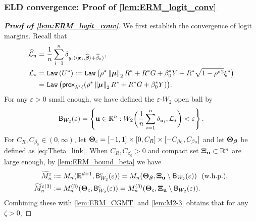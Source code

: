 \subsubsection{ELD convergence: Proof of \cref{lem:ERM_logit_conv}}
\label{append_subsubsec:ERM_logit}

\begin{proof}[\textbf{Proof of \cref{lem:ERM_logit_conv}}]
We first establish the convergence of logit margins. Recall that
\begin{align*}
    \widehat {\mathcal{L}}_{n} = \  & \frac1n \sum_{i=1}^n \delta_{y_i ( \langle \text{\boldmath $x$}_i, \widehat{{\boldsymbol{\beta}}} \rangle + \widehat\beta_{0} ) },
    \\ 
    \mathcal{L}_* = \  & \mathtt{Law} \, (U^*)
    := \mathtt{Law} \, \bigl( \rho^*\left\|{{\boldsymbol{\mu}}}\right\|_2 R^* + R^* G + \beta_0^* Y + R^* \sqrt{1 - \rho^*{}^2} \xi^* \bigr) 
    \\
    = \ & \mathtt{Law} \, \bigl( \mathsf{prox}_{ \lambda^* \ell}( \rho^* \left\|{{\boldsymbol{\mu}}}\right\|_2 R^* + R^* G + \beta_0^* Y ) \bigr).
\end{align*}
For any $\varepsilon > 0$ small enough, we have defined the $\varepsilon$-$W_2$ open ball by
\begin{equation*}
    \mathsf{B}_{W_2}(\varepsilon) = \left\{ \mathrm{\bf u} \in \mathbb{R}^n:   W_2 \biggl( 
        \frac{1}{n}\sum_{i=1}^n \delta_{u_i}, \mathcal{L}_*
     \biggr)  < \varepsilon \right\}.
\end{equation*}
For $C_R, C_{\beta_0} \in (0, \infty)$, let $\text{\boldmath $\Theta$}_{c} = [-1, 1] \times [0, C_R] \times [-C_{\beta_0}, C_{\beta_0}]$ and let $\text{\boldmath $\Theta$}_{{\boldsymbol{\beta}}}$ be defined as \cref{eq:Theta_link}. When $C_R, C_{\beta_0} > 0$ and compact set $\text{\boldmath $\Xi$}_{\mathrm{\bf u}} \subset \mathbb{R}^{n}$ are large enough, by \cref{lem:ERM_bound_beta} we have
\begin{align*}
    \widetilde M_n^\varepsilon & := M_n(\mathbb{R}^{d + 1}, \mathsf{B}_{W_2}^c(\varepsilon) ) 
    = M_n(\text{\boldmath $\Theta$}_{{\boldsymbol{\beta}}}, \text{\boldmath $\Xi$}_{\mathrm{\bf u}} \setminus \mathsf{B}_{W_2}(\varepsilon) ) \ \ (\text{w.h.p.}) ,
    \\
    \widetilde M_n^{\varepsilon(3)} 
    & :=
    M_n^{(3)}(\text{\boldmath $\Theta$}_{c}, \mathsf{B}_{W_2}^c(\varepsilon) )
    = M_n^{(3)}(\text{\boldmath $\Theta$}_{c}, \text{\boldmath $\Xi$}_{\mathrm{\bf u}} \setminus \mathsf{B}_{W_2}(\varepsilon) ).
\end{align*}
Combining these with \cref{lem:ERM_CGMT} and \ref{lem:M2-3} obtains that for any $\zeta > 0$,

\end{proof}
